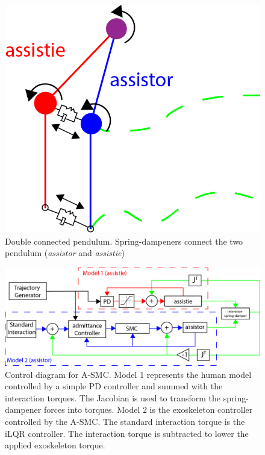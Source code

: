 \begin{figure}[hbt!]
    \centering
    \includegraphics[scale=1.5]{images/controllers/double_pend.png}
    \caption[Double connected pendulum]{Double connected pendulum. Spring-dampeners connect the two pendulum (\textit{assistor} and \textit{assistie}) }
    \label{fig:double_pend}
\end{figure}

\begin{figure}[hbt!]
    \centering
    \includegraphics[width=\linewidth]{images/controllers/SMC_control_diagram_overview.png}
    \caption[Control diagram for A-SMC]{Control diagram for A-SMC. Model 1 represents the human model controlled by a simple PD controller and summed with the interaction torques. The Jacobian is used to transform the spring-dampener forces into torques. Model 2 is the exoskeleton controller controlled by the A-SMC. The standard interaction torque is the iLQR controller. The interaction torque is subtracted to lower the applied exoskeleton torque. }
    \label{fig:controlDiagram}
\end{figure}


